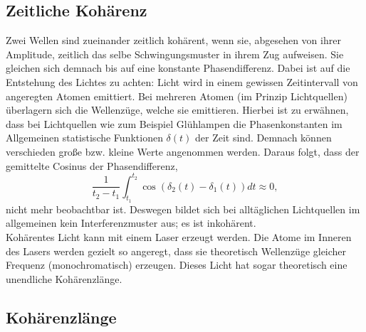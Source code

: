 \subsection{Zeitliche Kohärenz}
Zwei Wellen sind zueinander zeitlich kohärent, wenn sie, abgesehen von ihrer Amplitude, zeitlich das selbe Schwingungsmuster in ihrem Zug aufweisen.
Sie gleichen sich demnach bis auf eine konstante Phasendifferenz.
Dabei ist auf die Entstehung des Lichtes zu achten:
Licht wird in einem gewissen Zeitintervall von angeregten Atomen emittiert.
Bei mehreren Atomen (im Prinzip Lichtquellen) überlagern sich die Wellenzüge, welche sie emittieren.
Hierbei ist zu erwähnen, dass bei Lichtquellen wie zum Beispiel Glühlampen die Phasenkonstanten im Allgemeinen statistische Funktionen $\delta(t)$ der Zeit sind.
Demnach können verschieden große bzw. kleine Werte angenommen werden.
Daraus folgt, dass der gemittelte Cosinus der Phasendifferenz,
\begin{equation}
  \frac{1}{t_2-t_1} \int_{t_1}^{t_2} \cos{(\delta_2(t)-\delta_1(t))}dt \approx 0,
\end{equation}
nicht mehr beobachtbar ist.
Deswegen bildet sich bei alltäglichen Lichtquellen im allgemeinen kein Interferenzmuster aus; es ist inkohärent.\\
Kohärentes Licht kann mit einem Laser erzeugt werden.
Die Atome im Inneren des Lasers werden gezielt so angeregt, dass sie theoretisch Wellenzüge gleicher Frequenz (monochromatisch) erzeugen.
Dieses Licht hat sogar theoretisch eine unendliche Kohärenzlänge.

\subsection{Kohärenzlänge}

